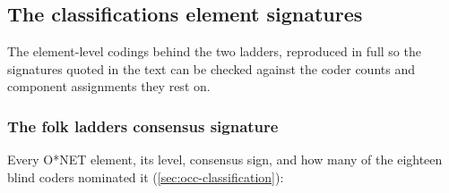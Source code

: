 \subsection{The classification\textquotesingle s element signatures}\label{sub:element-signatures}

The element-level codings behind the two ladders, reproduced in full so the
signatures quoted in the text can be checked against the coder counts and
component assignments they rest on.

\subsubsection{The folk ladder\textquotesingle s consensus signature}\label{sub:folk-signature}

Every O*NET element, its level, consensus sign, and how many of the eighteen
blind coders nominated it (\cref{sec:occ-classification}):

